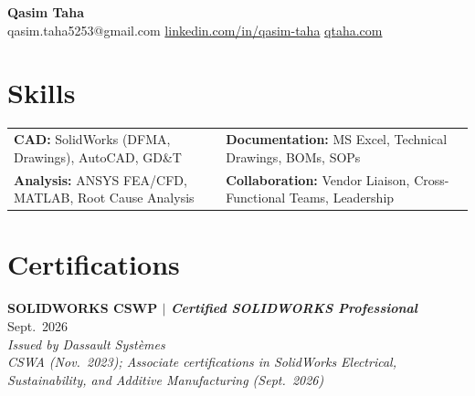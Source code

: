 \documentclass[11pt, letterpaper]{article}
\newcommand{\workEntry}[3]{%
  \noindent\textbf{#1} \hfill #2 \\
  \textit{#3}\vspace{0.5pt}
}
\begin{document}
\begin{center}
    {\fontsize{22}{26}\selectfont\textbf{Qasim Taha}} \\[4pt]
    {\large
    qasim.taha5253@gmail.com \; \textbar{} \;
    \href{https://linkedin.com/in/qasim-taha}{linkedin.com/in/qasim-taha} \; \textbar{} \;
    \href{https://qtaha.com}{qtaha.com}}
\end{center}

\vspace{0.3pt}

\section{Skills}
{\small{}
\noindent
\begin{tabularx}{\linewidth}{@{}>{\raggedright\arraybackslash}X|>{\raggedright\arraybackslash}X@{}}
\textbf{CAD:} SolidWorks (DFMA, Drawings), AutoCAD, GD\&T &
\textbf{Documentation:} MS Excel, Technical Drawings, BOMs, SOPs \\
\textbf{Analysis:} ANSYS FEA/CFD, MATLAB, Root Cause Analysis &
\textbf{Collaboration:} Vendor Liaison, Cross-Functional Teams, Leadership \\
\end{tabularx}}

\section{Certifications}

\workEntry{SOLIDWORKS CSWP \textnormal{$|$ \itshape Certified SOLIDWORKS Professional}}{Sept.~2026}{Issued by Dassault Syst\`emes} \\
\textit{CSWA (Nov.~2023); Associate certifications in SolidWorks Electrical, Sustainability, and Additive Manufacturing (Sept.~2026)}

\end{document}
